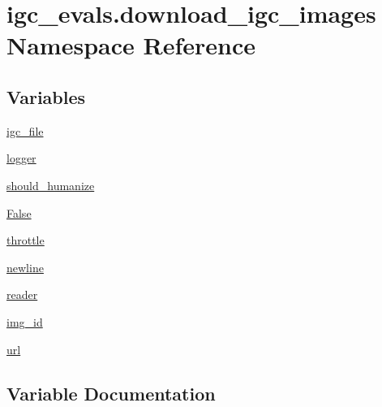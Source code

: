 \hypertarget{namespaceigc__evals_1_1download__igc__images}{}\section{igc\+\_\+evals.\+download\+\_\+igc\+\_\+images Namespace Reference}
\label{namespaceigc__evals_1_1download__igc__images}
\subsection*{Variables}
\begin{DoxyCompactItemize}
\item 
\hyperlink{namespaceigc__evals_1_1download__igc__images_af95507468b67fe453dfd4d7254b894ba}{igc\+\_\+file}
\item 
\hyperlink{namespaceigc__evals_1_1download__igc__images_a2e1a18a09c8fdce914fe05bf1edb2cbf}{logger}
\item 
\hyperlink{namespaceigc__evals_1_1download__igc__images_ae5956899af95807c24147990b7d85dda}{should\+\_\+humanize}
\item 
\hyperlink{namespaceigc__evals_1_1download__igc__images_a81731b7f76c15bf3b1a8e3f3e5f00a45}{False}
\item 
\hyperlink{namespaceigc__evals_1_1download__igc__images_a25d3d47134927e715a6d3600d31f6e8e}{throttle}
\item 
\hyperlink{namespaceigc__evals_1_1download__igc__images_af40decbeaa6737bece45e82196187a6e}{newline}
\item 
\hyperlink{namespaceigc__evals_1_1download__igc__images_a65884ad37b29b4934eb02580a2d8eb8f}{reader}
\item 
\hyperlink{namespaceigc__evals_1_1download__igc__images_a9b32fa34510e7ba895010636c9310a5d}{img\+\_\+id}
\item 
\hyperlink{namespaceigc__evals_1_1download__igc__images_aa45d448341160f30b2fdd7bbc078d970}{url}
\end{DoxyCompactItemize}


\subsection{Variable Documentation}
\mbox{\label{namespaceigc__evals_1_1download__igc__images_a81731b7f76c15bf3b1a8e3f3e5f00a45}} 
